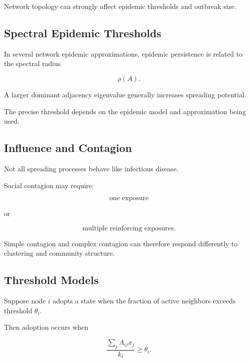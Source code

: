 Network topology can strongly affect epidemic thresholds and outbreak size.

\subsection{Spectral Epidemic Thresholds}
\label{subsec:spectral-epidemic-thresholds}

In several network epidemic approximations, epidemic persistence is related
to the spectral radius

\[
\boxed{
\rho(A).
}
\]

A larger dominant adjacency eigenvalue generally increases spreading
potential.

The precise threshold depends on the epidemic model and approximation being
used.

\subsection{Influence and Contagion}
\label{subsec:network-contagion}

Not all spreading processes behave like infectious disease.

Social contagion may require:

\[
\boxed{
\text{one exposure}
}
\]

or

\[
\boxed{
\text{multiple reinforcing exposures}.
}
\]

Simple contagion and complex contagion can therefore respond differently to
clustering and community structure.

\subsection{Threshold Models}
\label{subsec:network-threshold-models}

Suppose node \(i\) adopts a state when the fraction of active neighbors
exceeds threshold \(\theta_i\).

Then adoption occurs when

\[
\boxed{
\frac{
\sum_jA_{ij}x_j
}{
k_i
}
\geq
\theta_i.
}
\]

